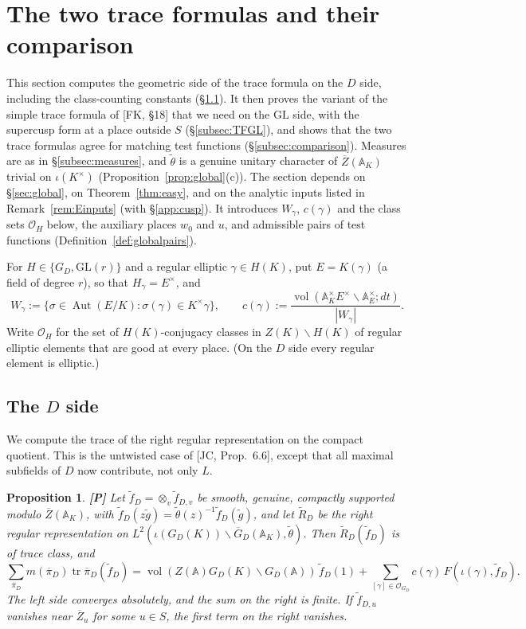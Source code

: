 \documentclass[12pt]{article}
\newcommand{\ov}[1]{\overline{#1}}
\newcommand{\A}{\mathbb{A}}
\newcommand{\tr}{\operatorname{tr}}
\newcommand{\Aut}{\operatorname{Aut}}
\newcommand{\vol}{\operatorname{vol}}
\newcommand{\GL}{\mathrm{GL}}
\newcommand{\Zb}{\ov{Z}}
\newcommand{\GDb}{\ov{G}_D}
\newcommand{\pib}{\ov{\pi}}
\newcommand{\Pv}{\textbf{[P]}}
\theoremstyle{plain}
\newtheorem{proposition}[theorem]{Proposition}
\theoremstyle{definition}
\begin{document}
\section{The two trace formulas and their comparison}\label{sec:TF}
This section computes the geometric side of the trace formula on the $D$ side, including the class-counting constants (\S\ref{subsec:TFD}). It then proves the variant of the simple trace formula of [FK, \S18] that we need on the $\GL$ side, with the supercusp form at a place outside $S$ (\S\ref{subsec:TFGL}), and shows that the two trace formulas agree for matching test functions (\S\ref{subsec:comparison}). Measures are as in \S\ref{subsec:measures}, and $\tilde\theta$ is a genuine unitary character of $\Zb(\A_K)$ trivial on $\iota(K^\times)$ (Proposition~\ref{prop:global}(c)). The section depends on \S\ref{sec:global}, on Theorem~\ref{thm:easy}, and on the analytic inputs listed in Remark~\ref{rem:Einputs} (with \S\ref{app:cusp}). It introduces $W_\gamma$, $c(\gamma)$ and the class sets $\mathcal O_H$ below, the auxiliary places $w_0$ and $u$, and admissible pairs of test functions (Definition~\ref{def:globalpairs}).

For $H\in\{G_D,\GL(r)\}$ and a regular elliptic $\gamma\in H(K)$, put $E=K(\gamma)$ (a field of degree $r$), so that $H_\gamma=E^\times$, and
\[ W_\gamma:=\{\sigma\in\Aut(E/K):\sigma(\gamma)\in K^\times\gamma\},\qquad c(\gamma):=\frac{\vol(\A_K^\times E^\times\backslash\A_E^\times;dt)}{|W_\gamma|}. \]
Write $\mathcal O_H$ for the set of $H(K)$-conjugacy classes in $Z(K)\backslash H(K)$ of regular elliptic elements that are good at every place. (On the $D$ side every regular element is elliptic.)

\subsection{The $D$ side}\label{subsec:TFD}
We compute the trace of the right regular representation on the compact quotient. This is the untwisted case of [JC, Prop.~6.6], except that all maximal subfields of $D$ now contribute, not only $L$.

\begin{proposition}\label{prop:geomD}\Pv
Let $\tilde f_D=\otimes_v\tilde f_{D,v}$ be smooth, genuine, compactly supported modulo $\Zb(\A_K)$, with $\tilde f_D(z\tilde g)=\tilde\theta(z)^{-1}\tilde f_D(\tilde g)$, and let $\tilde R_D$ be the right regular representation on $L^2(\iota(G_D(K))\backslash\GDb(\A_K),\tilde\theta)$. Then $\tilde R_D(\tilde f_D)$ is of trace class, and
\[ \sum_{\pib_D}m(\pib_D)\tr\pib_D(\tilde f_D)=\vol(Z(\A)G_D(K)\backslash G_D(\A))\,\tilde f_D(1)+\sum_{[\gamma]\in\mathcal O_{G_D}}c(\gamma)\,F(\iota(\gamma),\tilde f_D). \]
The left side converges absolutely, and the sum on the right is finite. If $\tilde f_{D,u}$ vanishes near $\Zb_u$ for some $u\in S$, the first term on the right vanishes.
\end{proposition}
\end{document}
